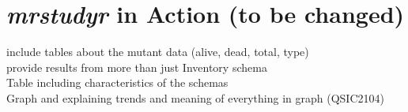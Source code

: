 \vspace*{-0.25cm}
\section{\textit{mrstudyr} in Action (to be changed)}

include tables about the mutant data (alive, dead, total, type) \\
provide results from more than just Inventory schema \\
Table including characteristics of the schemas \\
Graph and explaining trends and meaning of everything in graph (QSIC2104)



%
%
%
